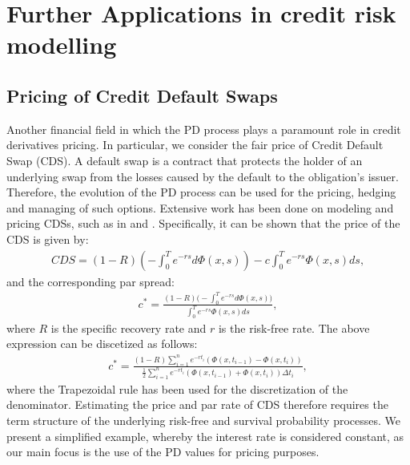 \documentclass[11pt,reqno]{article}
\theoremstyle{definition}
\begin{document}
\section{Further Applications in credit risk modelling}
\subsection{Pricing of Credit Default Swaps}
Another financial field in which the PD process plays a paramount role in credit derivatives pricing. In particular, we consider the fair price of Credit Default Swap (CDS). A default swap is a contract that protects the holder of an underlying swap from the losses caused by the default to the obligation’s issuer. Therefore, the evolution of the PD process can be used for the pricing, hedging and managing of such options. Extensive work has been done on modeling and pricing CDSs, such as in \cite{cariboni2007pricing} and \cite{houweling2005pricing}. Specifically, it can be shown that the price of the CDS is given by:
\begin{eqnarray}
C D S=(1-R)\left(-\int_{0}^{T} e^{-r s} d\Phi(x,s)\right)-c \int_{0}^{T} e^{-r s} \Phi(x,s) ds,
\end{eqnarray}
and the corresponding par spread:
\begin{eqnarray}
c^*=\frac{(1-R)\Big(-\int_{0}^{T} e^{-r s} d\Phi(x,s) \Big)} {\int_{0}^{T} e^{-r s} \Phi(x,s) ds}, 
\end{eqnarray}
where $R$ is the specific recovery rate and $r$ is the risk-free rate. The above expression can be discetized as follows:
\begin{eqnarray}
c^*=\frac{(1-R) \sum_{i=1}^{n} e^{-rt_i} (\Phi(x,t_{i-1})- \Phi(x,t_i))} {\frac{1}{2} \sum_{i=1}^{n}e^{-rt_i} (\Phi(x,t_{i-1}) + \Phi(x,t_i)) \Delta t_i}, 
\end{eqnarray}
where the Trapezoidal rule has been used for the discretization of the denominator. Estimating the price and par rate of CDS therefore requires the term structure of the underlying risk-free and survival probability processes. We present a simplified example, whereby the interest rate is considered constant, as our main focus is the use of the PD values for pricing purposes. 
\end{document}
